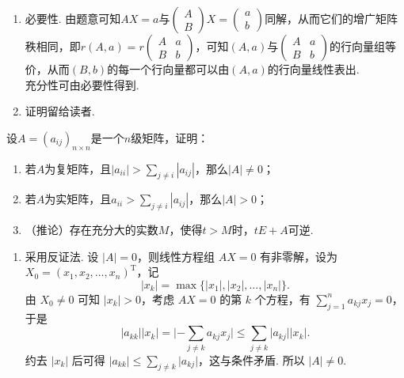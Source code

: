 \begin{exercise}
\begin{exgroup}
\begin{answer}
\begin{enumerate}
                \item 必要性. 由题意可知$AX=a$与$\begin{pmatrix} A \\ B \end{pmatrix}X=\begin{pmatrix} a \\ b \end{pmatrix}$同解，从而它们的增广矩阵秩相同，即$r(A,a)=r\begin{pmatrix}
                              A & a \\
                              B & b
                          \end{pmatrix}$，可知$(A,a)$与$\begin{pmatrix}
                              A & a \\
                              B & b
                          \end{pmatrix}$的行向量组等价，从而$(B,b)$的每一个行向量都可以由$(A,a)$的行向量线性表出.\\
                      充分性可由必要性得到.

                \item 证明留给读者.
            \end{enumerate}
        \end{answer}

        \item 设$A=(a_{ij})_{n \times n}$是一个$n$级矩阵，证明：
        \begin{enumerate}
            \item 若$A$为复矩阵，且$|a_{ii}|>\displaystyle\sum_{j \neq i}|a_{ij}|$，那么$|A|\neq 0$；

            \item 若$A$为实矩阵，且$a_{ii}>\displaystyle\sum_{j \neq i}|a_{ij}|$，那么$|A|>0$；

            \item （推论）存在充分大的实数$M$，使得$t>M$时，$tE+A$可逆.
        \end{enumerate}
        \begin{answer}
            \begin{enumerate}
                \item \label{item:15:B:5:1}
                      采用反证法. 设 $\lvert A \rvert = 0$，则线性方程组 $AX = 0$ 有非零解，设为 $X_0 = (x_1, x_2, \ldots, x_n)^{\mathrm{T}}$，记
                      \[\lvert x_k \rvert = \max \{\lvert x_1 \rvert, \lvert x_2 \rvert, \ldots, \lvert x_n \rvert\}.\]
                      由 $X_0 \neq 0$ 可知 $\lvert x_k \rvert > 0$，考虑 $AX = 0$ 的第 $k$ 个方程，有 $\displaystyle\sum_{j=1}^n a_{kj}x_j = 0$，于是
                      \[\lvert a_{kk} \rvert \lvert x_k \rvert = \lvert -\displaystyle\sum_{j \neq k}a_{kj}x_j \rvert \leqslant \sum_{j \neq k}\lvert a_{kj} \rvert \lvert x_k \rvert.\]
                      约去 $\lvert x_k \rvert$ 后可得 $\lvert a_{kk} \rvert \leqslant \displaystyle\sum_{j \neq k} \lvert a_{kj} \rvert$，这与条件矛盾. 所以 $\lvert A \rvert \neq 0$.


\end{enumerate}
\end{answer}
\end{exgroup}
\end{exercise}
